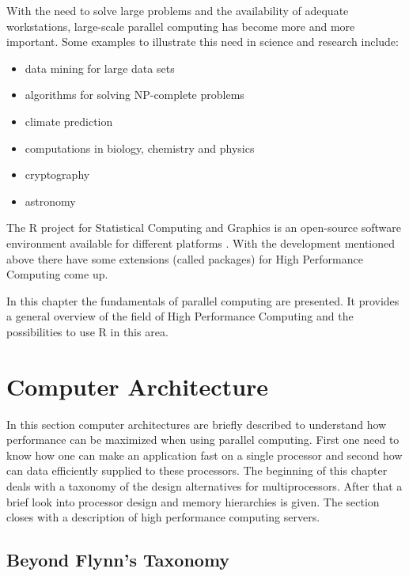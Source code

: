 With the need to solve large problems and the availability of adequate
workstations, large-scale parallel computing has become more and more
important. Some examples to illustrate this need in science and
research include:
\begin{itemize}
\item data mining for large data sets
\item algorithms for solving NP-complete problems
\item climate prediction
\item computations in biology, chemistry and physics
\item cryptography
\item astronomy
\end{itemize}

The R project for Statistical Computing and Graphics is an open-source
software environment available for different platforms \cite{R}. With the
development mentioned above there have some extensions (called
packages) for High Performance Computing come up.

In this chapter the fundamentals of parallel computing are
presented. It provides a general overview of the field of High
Performance Computing and the possibilities to use R in this area.


\section{Computer Architecture}
In this section computer architectures are briefly described to
understand how performance can be maximized when using parallel
computing. First one need to know how one can make an application fast
on a single processor and second how can data efficiently supplied to
these processors. The beginning of this chapter deals with a taxonomy of
the design alternatives for multiprocessors. After that a brief look
into processor design and memory hierarchies is given. The section
closes with a description of high performance computing servers.

\subsection{Beyond Flynn's Taxonomy}

